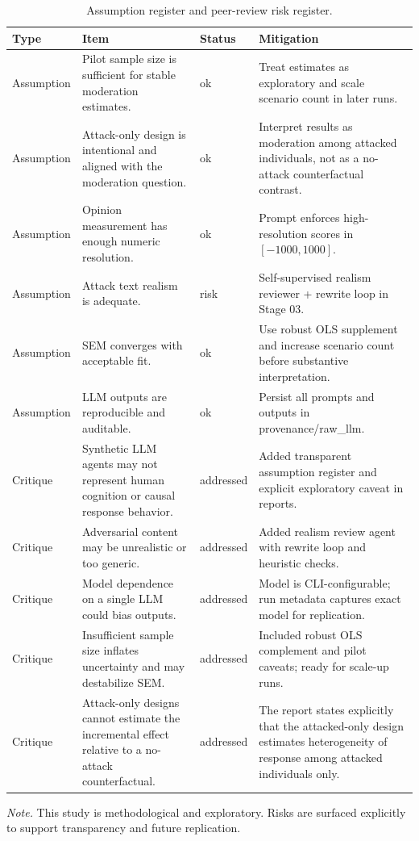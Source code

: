 \begin{table}[htbp]
\centering
\begin{threeparttable}
\caption{Assumption register and peer-review risk register.}
\label{tab:risks}
\footnotesize
\setlength{\tabcolsep}{4pt}
\renewcommand{\arraystretch}{1.15}
\begin{tabularx}{\linewidth}{lXlX}
\toprule
Type & Item & Status & Mitigation \\
\midrule
Assumption & Pilot sample size is sufficient for stable moderation estimates. & ok & Treat estimates as exploratory and scale scenario count in later runs. \\
Assumption & Attack-only design is intentional and aligned with the moderation question. & ok & Interpret results as moderation among attacked individuals, not as a no-attack counterfactual contrast. \\
Assumption & Opinion measurement has enough numeric resolution. & ok & Prompt enforces high-resolution scores in $[-1000, 1000]$. \\
Assumption & Attack text realism is adequate. & risk & Self-supervised realism reviewer + rewrite loop in Stage 03. \\
Assumption & SEM converges with acceptable fit. & ok & Use robust OLS supplement and increase scenario count before substantive interpretation. \\
Assumption & LLM outputs are reproducible and auditable. & ok & Persist all prompts and outputs in provenance/raw\_llm. \\
Critique & Synthetic LLM agents may not represent human cognition or causal response behavior. & addressed & Added transparent assumption register and explicit exploratory caveat in reports. \\
Critique & Adversarial content may be unrealistic or too generic. & addressed & Added realism review agent with rewrite loop and heuristic checks. \\
Critique & Model dependence on a single LLM could bias outputs. & addressed & Model is CLI-configurable; run metadata captures exact model for replication. \\
Critique & Insufficient sample size inflates uncertainty and may destabilize SEM. & addressed & Included robust OLS complement and pilot caveats; ready for scale-up runs. \\
Critique & Attack-only designs cannot estimate the incremental effect relative to a no-attack counterfactual. & addressed & The report states explicitly that the attacked-only design estimates heterogeneity of response among attacked individuals only. \\
\bottomrule
\end{tabularx}
\begin{tablenotes}[flushleft]
\footnotesize
\item \textit{Note.} This study is methodological and exploratory. Risks are surfaced explicitly to support transparency and future replication.
\end{tablenotes}
\end{threeparttable}
\end{table}
